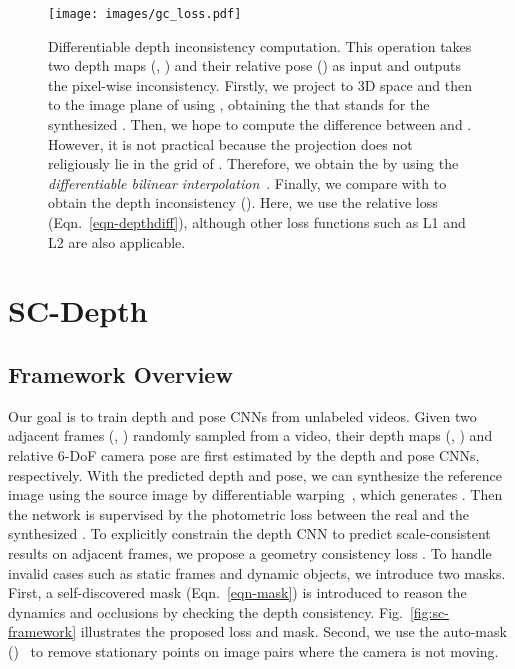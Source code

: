 \documentclass[twocolumn]{svjour3}
\renewcommand{\cite}[1]{\textcolor{blue}{\citep{#1}}}
\newcommand{\figref}[1]{Fig.~\ref{#1}}
\newcommand{\equref}[1]{Eqn.~\ref{#1}}
\begin{document}
\begin{figure}[ht]
  \centering
  \texttt{[image: images/gc\_loss.pdf]}
  \caption{Differentiable depth inconsistency computation. 
  This operation takes two depth maps (, ) and their relative pose () as input and outputs the pixel-wise inconsistency.
  Firstly, we project  to 3D space and then to the image plane of  using ,
  obtaining the  that stands for the synthesized .
  Then, we hope to compute the difference between  and .
  However, it is not practical because the projection does not religiously lie in the grid of .
  Therefore, we obtain the  by using the \emph{differentiable bilinear interpolation}~\cite{jaderberg2015stn}.
  Finally, we compare  with  to obtain the depth inconsistency ().
  Here, we use the relative loss (\equref{eqn-depthdiff}), although other loss functions such as L1 and L2 are also applicable.
  }\label{fig:gc-loss}
\end{figure}

\section{SC-Depth}\label{sec-learning}


\subsection{Framework Overview}\label{sec-overview}

Our goal is to train depth and pose CNNs from unlabeled videos. 
Given two adjacent frames (, ) randomly sampled from a video,
their depth maps (, ) and relative 6-DoF camera pose  
are first estimated by the depth and pose CNNs, respectively.
With the predicted depth and pose, 
we can synthesize the reference image  using the source image  by differentiable warping~\cite{jaderberg2015stn},
which generates .
Then the network is supervised by the photometric loss between 
the real  and the synthesized .
To explicitly constrain the depth CNN to predict scale-consistent results on adjacent frames,
we propose a geometry consistency loss .
To handle invalid cases such as static frames and dynamic objects, we introduce two masks. 
First, a self-discovered mask  (\equref{eqn-mask}) is introduced to reason the dynamics and occlusions by checking the depth consistency. 
\figref{fig:sc-framework} illustrates the proposed loss and mask.
Second, we use the auto-mask ()~\cite{monodepth2} to remove stationary points on image pairs where the camera is not moving.
\end{document}
